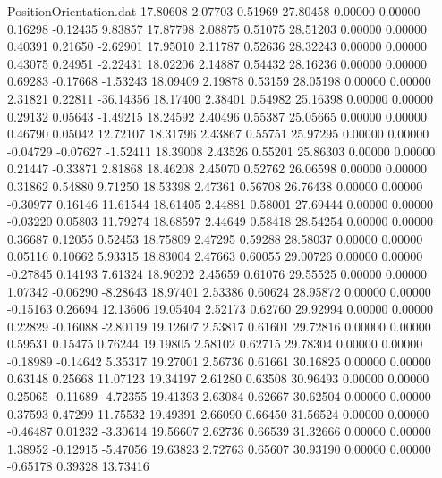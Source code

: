 \begin{filecontents}{PositionOrientation.dat}
  17.80608    2.07703    0.51969    27.80458    0.00000    0.00000    0.16298   -0.12435    9.83857
  17.87798    2.08875    0.51075    28.51203    0.00000    0.00000    0.40391    0.21650   -2.62901
  17.95010    2.11787    0.52636    28.32243    0.00000    0.00000    0.43075    0.24951   -2.22431
  18.02206    2.14887    0.54432    28.16236    0.00000    0.00000    0.69283   -0.17668   -1.53243
  18.09409    2.19878    0.53159    28.05198    0.00000    0.00000    2.31821    0.22811  -36.14356
  18.17400    2.38401    0.54982    25.16398    0.00000    0.00000    0.29132    0.05643   -1.49215
  18.24592    2.40496    0.55387    25.05665    0.00000    0.00000    0.46790    0.05042   12.72107
  18.31796    2.43867    0.55751    25.97295    0.00000    0.00000   -0.04729   -0.07627   -1.52411
  18.39008    2.43526    0.55201    25.86303    0.00000    0.00000    0.21447   -0.33871    2.81868
  18.46208    2.45070    0.52762    26.06598    0.00000    0.00000    0.31862    0.54880    9.71250
  18.53398    2.47361    0.56708    26.76438    0.00000    0.00000   -0.30977    0.16146   11.61544
  18.61405    2.44881    0.58001    27.69444    0.00000    0.00000   -0.03220    0.05803   11.79274
  18.68597    2.44649    0.58418    28.54254    0.00000    0.00000    0.36687    0.12055    0.52453
  18.75809    2.47295    0.59288    28.58037    0.00000    0.00000    0.05116    0.10662    5.93315
  18.83004    2.47663    0.60055    29.00726    0.00000    0.00000   -0.27845    0.14193    7.61324
  18.90202    2.45659    0.61076    29.55525    0.00000    0.00000    1.07342   -0.06290   -8.28643
  18.97401    2.53386    0.60624    28.95872    0.00000    0.00000   -0.15163    0.26694   12.13606
  19.05404    2.52173    0.62760    29.92994    0.00000    0.00000    0.22829   -0.16088   -2.80119
  19.12607    2.53817    0.61601    29.72816    0.00000    0.00000    0.59531    0.15475    0.76244
  19.19805    2.58102    0.62715    29.78304    0.00000    0.00000   -0.18989   -0.14642    5.35317
  19.27001    2.56736    0.61661    30.16825    0.00000    0.00000    0.63148    0.25668   11.07123
  19.34197    2.61280    0.63508    30.96493    0.00000    0.00000    0.25065   -0.11689   -4.72355
  19.41393    2.63084    0.62667    30.62504    0.00000    0.00000    0.37593    0.47299   11.75532
  19.49391    2.66090    0.66450    31.56524    0.00000    0.00000   -0.46487    0.01232   -3.30614
  19.56607    2.62736    0.66539    31.32666    0.00000    0.00000    1.38952   -0.12915   -5.47056
  19.63823    2.72763    0.65607    30.93190    0.00000    0.00000   -0.65178    0.39328   13.73416

\end{filecontents}
